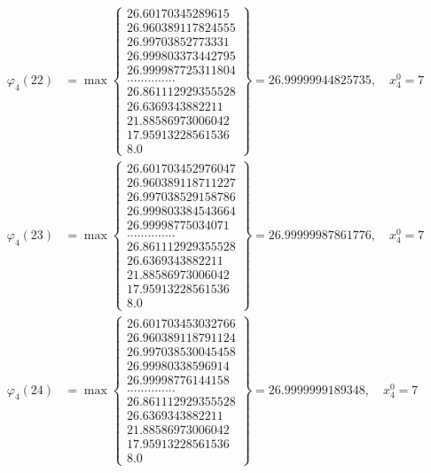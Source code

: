 \documentclass{article}
\begin{document}
\begin{align*}
  
  
  
\varphi_{4}(22) &= \max \left\{ \begin{array}{c}
26.60170345289615 \\
 26.960389117824555 \\
 26.99703852773331 \\
 26.999803373442795 \\
 26.999987725311804 \\
 .............. \\
 26.861112929355528 \\
 26.6369343882211 \\
 21.88586973006042 \\
 17.95913228561536 \\
 8.0
\end{array} \right\} = 26.99999944825735, \quad x_{4}^0 = 7\\
  
  
  
  
\varphi_{4}(23) &= \max \left\{ \begin{array}{c}
26.601703452976047 \\
 26.960389118711227 \\
 26.997038529158786 \\
 26.999803384543664 \\
 26.99998775034071 \\
 .............. \\
 26.861112929355528 \\
 26.6369343882211 \\
 21.88586973006042 \\
 17.95913228561536 \\
 8.0
\end{array} \right\} = 26.99999987861776, \quad x_{4}^0 = 7\\
  
  
  
  
\varphi_{4}(24) &= \max \left\{ \begin{array}{c}
26.601703453032766 \\
 26.960389118791124 \\
 26.997038530045458 \\
 26.99980338596914 \\
 26.99998776144158 \\
 .............. \\
 26.861112929355528 \\
 26.6369343882211 \\
 21.88586973006042 \\
 17.95913228561536 \\
 8.0
\end{array} \right\} = 26.9999999189348, \quad x_{4}^0 = 7\\
  

\end{align*}
\end{document}
